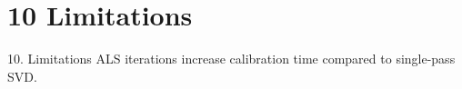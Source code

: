 \section{10 Limitations}

 10. Limitations
ALS iterations increase calibration time compared to single-pass SVD.
